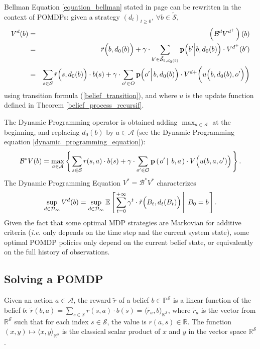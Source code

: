 Bellman Equation \ref{equation_bellman} stated in page \pageref{equation_bellman} 
can be rewritten in the context of POMDPs:
given a strategy $(d_t)_{t \geqslant 0}$, $\forall b \in \tilde{\mathcal{S}}$,
\begin{eqnarray*}
V^d(b) & = & \left( \left. \mathcal{B}^d V^{d^+} \right. \right)(b) \\
& = & \tilde{r} \Big( b,d_0(b) \Big) + \gamma \cdot \sum_{b' \in \tilde{\mathcal{S}}_{b,d_0(b)} } \textbf{p} \Big( b' \Big\vert b,d_{0}(b) \Big) \cdot V^{d^+}(b') \\
& = & \sum_{s \in \mathcal{S}} \tilde{r} \Big( s,d_0(b) \Big) \cdot b(s)  + \gamma \cdot \sum_{o' \in O}  \textbf{p} \Big( o' \Big\vert \hspace{0.05cm} b, d_0(b) \Big) \cdot V^{d+} \bigg( u \Big(b, d_0(b), o' \Big) \bigg) 
\end{eqnarray*} 
using transition formula (\ref{belief_transition}), and where $u$ is the update function defined in Theorem \ref{belief_process_recursif}.

The Dynamic Programming operator
is obtained adding $\max_{a \in \mathcal{A}}$ at the beginning, 
and replacing $d_0(b)$ by $a \in \mathcal{A}$ 
(see the Dynamic Programming equation \ref{dynamic_programming_equation}):
\begin{equation}
\label{equation_bellmanOperator_POMDP}
 \mathcal{B}^* V(b) = \max_{a \in \mathcal{A}} \left\{ \left.  \sum_{s \in \mathcal{S}} r(s,a) \cdot b(s) + \gamma \cdot \sum_{o' \in \mathcal{O}} \textbf{p} \left( \left. o' \, \right| \left. \, b , a  \right. \right) \cdot V \Big( u(b,a,o')  \Big)  \right. \right\}. 
\end{equation}
The Dynamic Programming Equation $V^* = \mathcal{B}^* V^*$ characterizes 
\[ \sup_{d \in \mathcal{D}_{\infty}} V^{d}(b) = \sup_{d \in \mathcal{D}_{\infty}} \mathbb{E} \left[ \left.  \sum_{t=0}^{+ \infty} \gamma^t \cdot \tilde{r}\Big(B_t,d_t(B_t)\Big) \, \right| \left. \, B_0=b   \right. \right]. \]
Given the fact that some optimal MDP strategies
are Markovian for additive criteria
(\textit{i.e.} only depends on the time step 
and the current system state),
some optimal POMDP policies 
only depend on the current belief state,
or equivalently on the full history of observations.

\subsection{Solving a POMDP}
Given an action $a \in \mathcal{A}$, 
the reward $\tilde{r}$ of a belief $b \in \mathbb{P}^{\mathcal{S}}$ 
is a linear function of the belief $b$: $\tilde{r}(b,a) = \sum_{s \in \mathcal{S}} r(s,a) \cdot b(s) = \langle \tilde{r}_a, b \rangle_{\mathbb{R}^{\mathcal{S}}}$,
where $\tilde{r}_a$ is the vector from $\mathbb{R}^{\mathcal{S}}$ 
such that for each index $s \in \mathcal{S}$, the value is $r(a,s) \in \mathbb{R}$. 
The function $(x,y) \mapsto \langle x , y \rangle_{\mathbb{R}^{\mathcal{S}}}$
is the classical scalar product of $x$ and $y$ in the vector space $\mathbb{R}^{\mathcal{S}}$.


